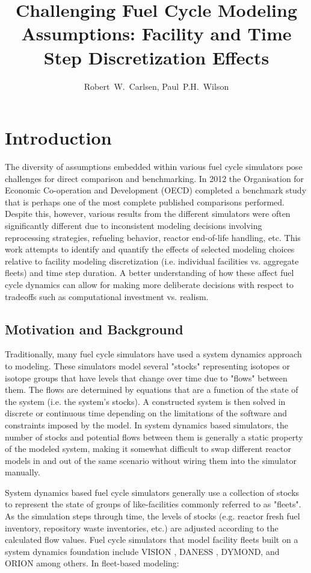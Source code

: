 \documentclass{style}
\title{Challenging Fuel Cycle Modeling Assumptions: Facility and Time Step Discretization Effects}
\author{Robert~W.~Carlsen, Paul~P.H.~Wilson}
\institute{University of Wisconsin - Madison, Department of Nuclear Engineering and Engineering Physics, Madison, WI 53706}
\date{}
\begin{document}
\section{Introduction}

The diversity of assumptions embedded within various fuel cycle simulators pose challenges for direct
comparison and benchmarking.  In 2012 the Organisation for
Economic Co-operation and Development (OECD) completed a benchmark study
\cite{oecd2012benchmark} that is perhaps one of the most complete published
comparisons performed.  Despite this, however, various results from the
different simulators were often significantly different due to inconsistent
modeling decisions involving reprocessing strategies, refueling behavior,
reactor end-of-life handling, etc.  This work attempts to identify and
quantify the effects of selected modeling choices relative to facility modeling
discretization (i.e. individual facilities vs. aggregate fleets) and time step
duration.  A better understanding of how these affect fuel cycle dynamics can
allow for making more deliberate decisions with respect to tradeoffs such as
computational investment vs. realism.

\subsection{Motivation and Background}

Traditionally, many fuel cycle simulators have used a system dynamics approach
\cite{forrester_industrial_1961} to modeling. These simulators model several
"stocks" representing isotopes or isotope groups that have levels that change
over time due to "flows" between them.  The flows are determined by equations
that are a function of the state of the system (i.e. the system's stocks).  A
constructed system is then solved in discrete or continuous time depending on
the limitations of the software and constraints imposed by the model.  In
system dynamics based simulators, the number of stocks and potential flows between
them is generally a static property of the modeled system, making it somewhat
difficult to swap different reactor models in and out of the same scenario
without wiring them into the simulator manually.

System dynamics based fuel cycle simulators generally use a collection of
stocks to represent the state of groups of like-facilities commonly referred
to as "fleets".  As the simulation steps through time, the levels of stocks
(e.g. reactor fresh fuel inventory, repository waste inventories, etc.) are
adjusted according to the calculated flow values.  Fuel cycle simulators that model
facility fleets built on a system dynamics foundation include VISION
\cite{jacobson_verifiable_2010}, DANESS \cite{van_den_durpel_daness_2009},
DYMOND, and ORION \cite{gregg_orion_2012} among
others.  In fleet-based modeling:
\end{document}
